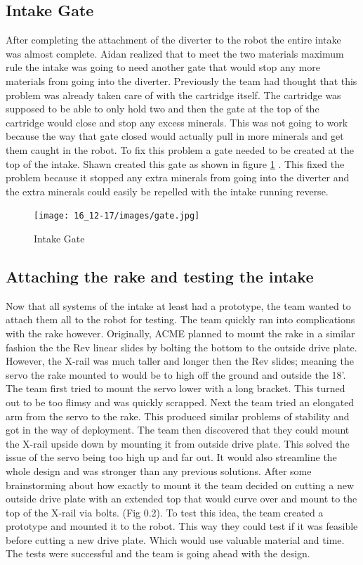 \documentclass{article}
\begin{document}
\subsection{Intake Gate}
After completing the attachment of the diverter to the robot the entire intake was almost complete. Aidan realized that to meet the two materials maximum rule the intake was going to need another gate that would stop any more materials from going into the diverter. Previously the team had thought that this problem was already taken care of with the cartridge itself. The cartridge was supposed to be able to only hold two and then the gate at the top of the cartridge would close and stop any excess minerals. This was not going to work because the way that gate closed would actually pull in more minerals and get them caught in the robot. To fix this problem a gate needed to be created at the top of the intake. Shawn created this gate as shown in figure \ref{fig:gate} . This fixed the problem because it stopped any extra minerals from going into the diverter and the extra minerals could easily be repelled with the intake running reverse.

\begin{figure}
    \centering
    \texttt{[image: 16\_12-17/images/gate.jpg]}
    \caption{Intake Gate}
    \label{fig:gate}
\end{figure}

\subsection{Attaching the rake and testing the intake}
Now that all systems of the intake at least had a  prototype, the team wanted to attach them all to the robot for testing. The team quickly ran into complications with the rake however. Originally, ACME planned to mount the rake in a similar fashion the the Rev linear slides by bolting the bottom to the outside drive plate. However, the X-rail was much taller and longer then the Rev slides; meaning the servo the rake mounted to would be to high off the ground and outside the 18'. The team first tried to mount the servo lower with a long bracket. This turned out to be too flimsy and was quickly scrapped. Next the team tried an elongated arm from the servo to the rake. This produced similar problems of stability and got in the way of deployment. The team then discovered that they could mount the X-rail upside down by mounting it from outside drive plate. This solved the issue of the servo being too high up and far out. It would also streamline the whole design and was stronger than any previous solutions. After some brainstorming about how exactly to mount it the team decided on cutting a new outside drive plate with an extended top that would curve over and mount to the top of the X-rail via bolts. (Fig 0.2). To test this idea, the team created a prototype and mounted it to the robot. This way they could test if it was feasible before cutting a new drive plate. Which would use valuable material and time. The tests were successful and the team is going ahead with the design. 
\end{document}
